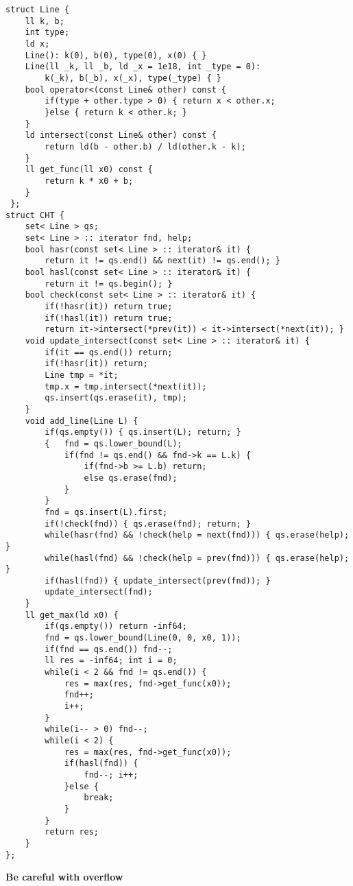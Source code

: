 \documentclass[12pt]{article}
\begin{document}
\begin{verbatim}
struct Line {
    ll k, b;
    int type;
    ld x;
    Line(): k(0), b(0), type(0), x(0) { }
    Line(ll _k, ll _b, ld _x = 1e18, int _type = 0): 
        k(_k), b(_b), x(_x), type(_type) { }
    bool operator<(const Line& other) const {
        if(type + other.type > 0) { return x < other.x;
        }else { return k < other.k; }
    }
    ld intersect(const Line& other) const {
        return ld(b - other.b) / ld(other.k - k);
    }
    ll get_func(ll x0) const {
        return k * x0 + b;
    }
 };
struct CHT {
    set< Line > qs;
    set< Line > :: iterator fnd, help;
    bool hasr(const set< Line > :: iterator& it) {
        return it != qs.end() && next(it) != qs.end(); }
    bool hasl(const set< Line > :: iterator& it) {
        return it != qs.begin(); }
    bool check(const set< Line > :: iterator& it) {
        if(!hasr(it)) return true;
        if(!hasl(it)) return true;
        return it->intersect(*prev(it)) < it->intersect(*next(it)); }
    void update_intersect(const set< Line > :: iterator& it) {
        if(it == qs.end()) return;
        if(!hasr(it)) return;
        Line tmp = *it;
        tmp.x = tmp.intersect(*next(it));
        qs.insert(qs.erase(it), tmp);
    }
    void add_line(Line L) {
        if(qs.empty()) { qs.insert(L); return; }
        {   fnd = qs.lower_bound(L);
            if(fnd != qs.end() && fnd->k == L.k) {
                if(fnd->b >= L.b) return;
                else qs.erase(fnd);
            } 
        }
        fnd = qs.insert(L).first;
        if(!check(fnd)) { qs.erase(fnd); return; }
        while(hasr(fnd) && !check(help = next(fnd))) { qs.erase(help); }
        while(hasl(fnd) && !check(help = prev(fnd))) { qs.erase(help); }
        if(hasl(fnd)) { update_intersect(prev(fnd)); }
        update_intersect(fnd);
    }
    ll get_max(ld x0) {
        if(qs.empty()) return -inf64;
        fnd = qs.lower_bound(Line(0, 0, x0, 1));
        if(fnd == qs.end()) fnd--;
        ll res = -inf64; int i = 0;
        while(i < 2 && fnd != qs.end()) {
            res = max(res, fnd->get_func(x0));
            fnd++;
            i++;
        }
        while(i-- > 0) fnd--;
        while(i < 2) {
            res = max(res, fnd->get_func(x0));
            if(hasl(fnd)) {
                fnd--; i++;
            }else {
                break;
            }
        }
        return res;
    }
};
\end{verbatim}

{\bf Be careful with overflow}
\end{document}
